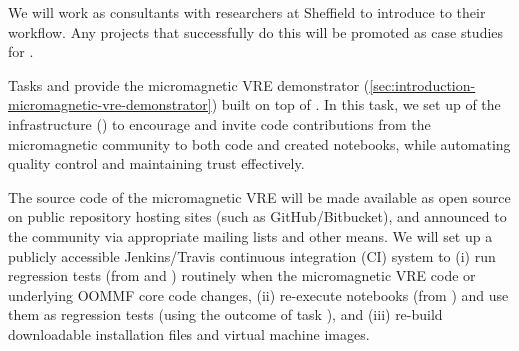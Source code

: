 \begin{workpackage}
\begin{tasklist}
\begin{task}[title=Introduce \TheProject to researchers and teachers, id=project-intro,lead=USH,PM=6]
We will work as consultants with researchers at Sheffield to introduce
\TheProject to their workflow. Any projects that successfully do this
will be promoted as case studies for \TheProject.
\end{task}

\begin{task}[id=dissemination-of-oommf-nb-virtual-environment,
  title=Open source dissemination of micromagnetic VRE,
  lead=USO,PM=4,partners={SR,USH,PS}]
  Tasks  and
   provide the
  micromagnetic VRE demonstrator
  (\ref{sec:introduction-micromagnetic-vre-demonstrator}) built on top
  of \TheProject.  In this task, we set up of the infrastructure
  () to encourage
  and invite code contributions from the micromagnetic community to
  both code and created notebooks, while automating quality control
  and maintaining trust effectively.

  The source code of the micromagnetic VRE will be made available as
  open source on public repository hosting sites (such as
  GitHub/Bitbucket), and announced to the community via appropriate
  mailing lists and other means. We will set up a publicly accessible
  Jenkins/Travis continuous integration (CI) system to (i) run
  regression tests (from
   and
  ) routinely when the
  micromagnetic VRE code or underlying OOMMF core code changes, (ii)
  re-execute notebooks (from
  ) and use them as
  regression tests (using the outcome of task
  ), and (iii) re-build
  downloadable installation files and virtual machine images.


\end{task}

\begin{task}[title=Micromagnetic VRE dissemination workshops,
id=dissemination-of-oommf-nb-workshops,lead=USO,PM=6]



\end{task}
\end{tasklist}
\end{workpackage}
